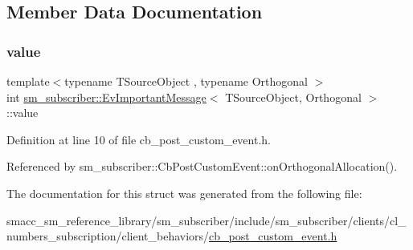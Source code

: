 \subsection{Member Data Documentation}
\mbox{\label{structsm__subscriber_1_1EvImportantMessage_af8ab5c9a95396460b4a3d2a8c9da5877}} 
\subsubsection{\texorpdfstring{value}{value}}
{\footnotesize\ttfamily template$<$typename T\+Source\+Object , typename Orthogonal $>$ \\
int \hyperlink{structsm__subscriber_1_1EvImportantMessage}{sm\+\_\+subscriber\+::\+Ev\+Important\+Message}$<$ T\+Source\+Object, Orthogonal $>$\+::value}



Definition at line 10 of file cb\+\_\+post\+\_\+custom\+\_\+event.\+h.



Referenced by sm\+\_\+subscriber\+::\+Cb\+Post\+Custom\+Event\+::on\+Orthogonal\+Allocation().



The documentation for this struct was generated from the following file\+:\begin{DoxyCompactItemize}
\item 
smacc\+\_\+sm\+\_\+reference\+\_\+library/sm\+\_\+subscriber/include/sm\+\_\+subscriber/clients/cl\+\_\+numbers\+\_\+subscription/client\+\_\+behaviors/\hyperlink{cb__post__custom__event_8h}{cb\+\_\+post\+\_\+custom\+\_\+event.\+h}\end{DoxyCompactItemize}
